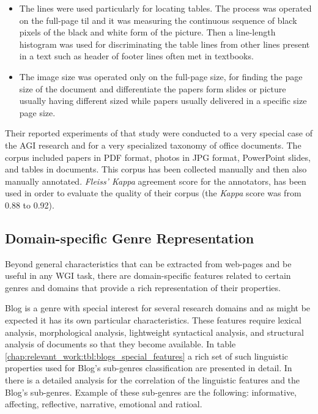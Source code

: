 \begin{itemize}
\item The lines were used particularly for locating tables. The process was operated on the full-page til and it was measuring the continuous sequence of black pixels of the black and white form of the picture. Then a line-length histogram was used for discriminating the table lines from other lines present in a text such as header of footer lines often met in textbooks.
\item The image size was operated only on the full-page size, for finding the page size of the document and differentiate the papers form slides or picture usually having different sized while papers usually delivered in a specific size page size.
\end{itemize}

Their reported experiments of that study were conducted to a very special case of  the AGI research and for a very specialized taxonomy of office documents. The corpus included papers in PDF format, photos in JPG format, PowerPoint slides, and tables in documents. This corpus has been collected manually and then also manually annotated. \textit{Fleiss' Kappa} agreement score for the annotators, has been used in order to evaluate the quality of their corpus (the \textit{Kappa} score was from 0.88 to 0.92).

\subsection{Domain-specific Genre Representation}

Beyond general characteristics that can be extracted from web-pages and be useful in any WGI task, there are domain-specific features related to certain genres and domains that provide a rich representation of their properties.

Blog is a genre with special interest for several research domains and as might be expected it has its own particular characteristics. These features require lexical analysis, morphological analysis, lightweight syntactical analysis, and structural analysis of documents so that they become available. In table \ref{chap:relevant_work:tbl:blogs_special_features} a rich set of such linguistic properties used for Blog's sub-genres classification are presented in detail. In \parencite{virik2017blog} there is a detailed analysis for the correlation of the linguistic features and the Blog's sub-genres. Example of these sub-genres are the following: informative, affecting, reflective, narrative, emotional and ratioal.

